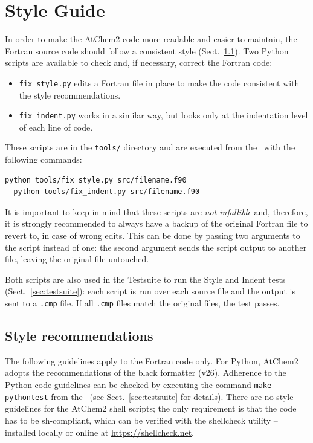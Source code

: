 \section{Style Guide} \label{sec:style-guide}

In order to make the AtChem2 code more readable and easier to
maintain, the Fortran source code should follow a consistent style
(Sect.~\ref{subsec:style-recommendations}). Two Python scripts are
available to check and, if necessary, correct the Fortran code:

\begin{itemize}
\item \texttt{fix\_style.py} edits a Fortran file in place to make the
  code consistent with the style recommendations.
\item \texttt{fix\_indent.py} works in a similar way, but looks only
  at the indentation level of each line of code.
\end{itemize}

These scripts are in the \texttt{tools/} directory and are executed
from the \maindir\ with the following commands:

\begin{Verbatim}[fontsize=\small]
  python tools/fix_style.py src/filename.f90
  python tools/fix_indent.py src/filename.f90
\end{Verbatim}

It is important to keep in mind that these scripts are \emph{not infallible}
and, therefore, it is strongly recommended to always have a backup of the
original Fortran file to revert to, in case of wrong edits. This can be
done by passing two arguments to the script instead of one: the second
argument sends the script output to another file, leaving the original
file untouched.

Both scripts are also used in the Testsuite to run the Style and
Indent tests (Sect.~\ref{sec:testsuite}): each script is run over
each source file and the output is sent to a \texttt{.cmp} file. If
all \texttt{.cmp} files match the original files, the test passes.

\subsection{Style recommendations} \label{subsec:style-recommendations}

The following guidelines apply to the Fortran code only. For Python, AtChem2 adopts the
recommendations of the \href{https://pypi.org/project/black}{black} formatter (v26). Adherence
to the Python code guidelines can be checked by executing the command \verb|make pythontest|
from the \maindir\ (see Sect.~\ref{sec:testsuite} for details). There are no style guidelines
for the AtChem2 shell scripts; the only requirement is that the code has to be sh-compliant,
which can be verified with the shellcheck utility -- installed locally or online at
\href{https://shellcheck.net}{https://shellcheck.net}.


